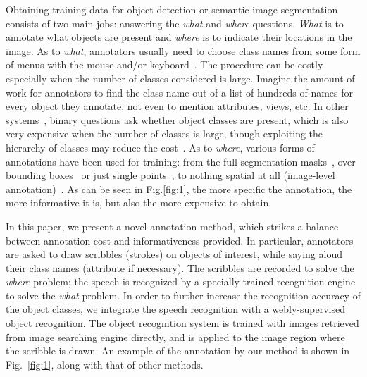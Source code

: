 \documentclass[runningheads]{llncs}
\begin{document}
Obtaining training data for object detection or semantic image segmentation consists of two main
jobs: answering the \emph{what} and \emph{where} questions. \emph{What} is to annotate what
objects are present and \emph{where} is to indicate their locations in
the image.  As to \emph{what}, annotators usually need to choose class
names from some form of menus with the mouse and/or
keyboard~\citep{open:surface}. The procedure can be costly especially
when the number of classes considered is large. Imagine the amount of
work for annotators to find the class name out of a list of hundreds
of names for every object they annotate, not even to mention
attributes, views, etc. In other systems~\citep{whatpoint, coco:eccv},
binary questions ask whether object classes are present, which is also
very expensive when the number of classes is large, though exploiting
the hierarchy of classes may reduce the
cost~\citep{scalable:annotation, coco:eccv}. As to \emph{where},
various forms of annotations have been used for training: from the
full segmentation masks~\citep{rcnn, rcnn_crf, crfasrnn}, over
bounding boxes~\citep{weak:seg:xu, BoxSup, ConsCNN} or just single
points~\citep{whatpoint}, to nothing spatial at all (image-level
annotation)~\citep{markov:topic, cnn:em}.  As can be seen in Fig.\ref{fig:1}, the more
specific the annotation, the more informative it is, but also the more
expensive to obtain. %

In this paper, we present a novel annotation method, which strikes a
balance between annotation cost and informativeness provided. In
particular, annotators are asked to draw scribbles (strokes) on objects of
interest, while saying aloud their class names (attribute if necessary). The 
scribbles are recorded to solve the \emph{where}
problem; the speech is recognized by a specially trained
recognition engine to solve the \emph{what} problem. 
In order to further increase the recognition accuracy of the object classes, we integrate the speech recognition with a webly-supervised object recognition.  
The object recognition system is trained with images retrieved from image searching engine directly, and is applied to the image region where the scribble is drawn.  
An example of the annotation by our method is shown in Fig.~\ref{fig:1}, along with
that of other methods.
\end{document}
